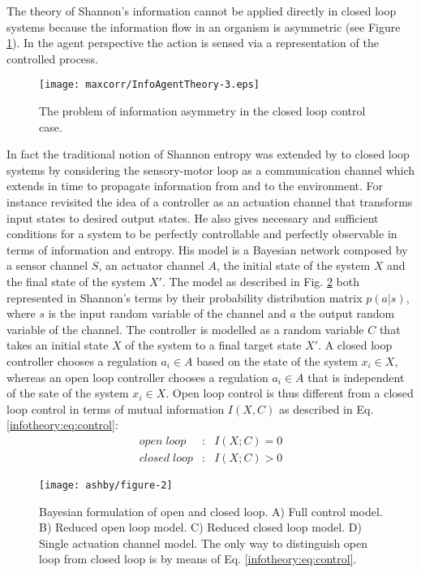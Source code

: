 The theory of Shannon's information cannot be applied directly in closed loop
 systems because the information flow in an organism is asymmetric
(see Figure \ref{Figure:maxcorr:asymmetry}).
In the agent perspective the action is sensed via a representation of the
controlled process.

\begin{figure}[ht]
  \begin{center}
    \texttt{[image: maxcorr/InfoAgentTheory-3.eps]}
    \caption[Information asymmetry in the organism]{
	     The problem of information asymmetry in the closed loop control case.
	      \label{Figure:maxcorr:asymmetry}}
  \end{center}
\end{figure}

In fact the traditional notion of Shannon entropy was extended by \citet{Touchette2004} to closed loop
systems by considering the sensory-motor loop as a communication channel which 
extends in time to propagate information from and to the environment.
For instance \citet{Touchette2004} revisited the idea of a controller as
 an actuation channel that transforms input states to desired output states.
He also gives necessary and sufficient conditions for a system to be perfectly
 controllable and perfectly observable in terms of information and entropy.
His model is a Bayesian network composed by a sensor channel $S$,
an actuator channel $A$, the initial state of the system $X$ and the final
state of the system $X'$. The model as described in Fig. \ref{fig:tishby1} both
represented in Shannon's terms by their probability distribution matrix $p(a|s)$,
where $s$ is the input random variable of the channel and $a$ the output random
variable of the channel.
The controller is modelled as a random variable $C$ that takes an initial state
 $X$ of the system to a final target state $X'$. A closed loop controller chooses
a regulation $a_i \in A$ based on the state of the system $x_i \in X$, whereas an open loop
 controller chooses a regulation $a_i \in A$ that is independent of the sate of the system $x_i \in X$.
Open loop control is thus different from a closed loop control in terms of
mutual information $I(X,C)$ as described in Eq. \ref{infotheory:eq:control}: 
\begin{eqnarray}
open \; loop &:& I(X;C)=0\\
closed \; loop&:& I(X;C)>0
\label{infotheory:eq:control}
\end{eqnarray}

\begin{figure}[!htbp]
\begin{center}
\texttt{[image: ashby/figure-2]}
\caption[Bayes formulation in traditional control]{
Bayesian formulation of open and closed loop.
A) Full control model.
B) Reduced open loop model.
C) Reduced closed loop model.
D) Single actuation channel model.
The only way to distinguish open loop from closed loop is by means of Eq. \ref{infotheory:eq:control}.
\label{fig:tishby1}
}
\end{center}

\end{figure}

